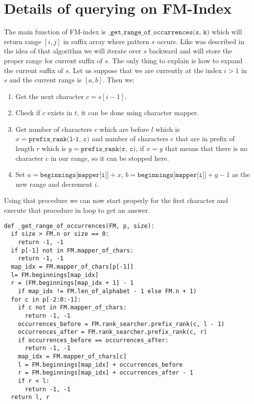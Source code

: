 \section{Details of querying on FM-Index}

The main function of FM-index is $\texttt{\_get\_range\_of\_occurrences(s, k)}$ which will return range $[i, j]$ in suffix array where pattern $s$ occurs. Like was described in the idea of that algorithm we will iterate over $s$ backward and will store the proper range for current suffix of $s$. The only thing to explain is how to expand the current suffix of $s$. Let us suppose that we are currently at the index $i > 1$ in $s$ and the current range is $[a, b]$. Then we:

\begin{enumerate}
    \item Get the next character $c = s[i-1]$.
    \item Check if $c$ exists in $t$, it can be done using character mapper.
    \item Get number of characters $c$ which are before $l$ which is $x = \texttt{prefix\_rank(l-1, c)}$ and number of characters $c$ that are in prefix of length $r$ which is $y = \texttt{prefix\_rank(r, c)}$, if $x = y$ that means that there is no character $c$ in our range, so it can be stopped here.
    \item Set $a = \texttt{beginnings[mapper[i]]} + x$, $b = \texttt{beginnings[mapper[i]]} + y - 1$ as the new range and decrement $i$.
\end{enumerate}

Using that procedure we can now start properly for the first character and execute that procedure in loop to get an answer.

\begin{verbatim}
def _get_range_of_occurrences(FM, p, size):
  if size > FM.n or size == 0:
    return -1, -1
  if p[-1] not in FM.mapper_of_chars:
    return -1, -1
  map_idx = FM.mapper_of_chars[p[-1]]
  l= FM.beginnings[map_idx]
  r = (FM.beginnings[map_idx + 1] - 1
    if map_idx != FM.len_of_alphabet - 1 else FM.n + 1)
  for c in p[-2:0:-1]:
    if c not in FM.mapper_of_chars:
      return -1, -1
    occurrences_before = FM.rank_searcher.prefix_rank(c, l - 1)
    occurrences_after = FM.rank_searcher.prefix_rank(c, r)
    if occurrences_before == occurrences_after:
      return -1, -1
    map_idx = FM.mapper_of_chars[c]
    l = FM.beginnings[map_idx] + occurrences_before
    r = FM.beginnings[map_idx] + occurrences_after - 1
    if r < l:
      return -1, -1
  return l, r
\end{verbatim}
